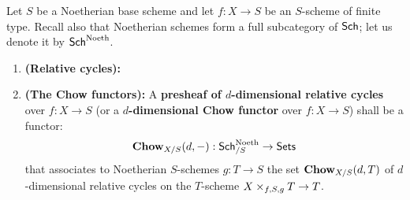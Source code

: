                 \begin{definition} \label{def: algebraic_cycles}
                    Let $S$ be a Noetherian base scheme and let $f: X \to S$ be an $S$-scheme of finite type. Recall also that Noetherian schemes form a full subcategory of $\mathsf{Sch}$; let us denote it by $\mathsf{Sch}^{\mathrm{Noeth}}$. 
                        \begin{enumerate}
                            \item \textbf{(Relative cycles):} 
                            \item \textbf{(The Chow functors):} A \textbf{presheaf of $d$-dimensional relative cycles} over $f: X \to S$ (or a \textbf{$d$-dimensional Chow functor} over $f: X \to S$) shall be a functor:
                                $$\mathbf{Chow}_{X/S}(d, -): \mathsf{Sch}_{/S}^{\mathrm{Noeth}} \to \mathsf{Sets}$$
                            that associates to Noetherian $S$-schemes $g: T \to S$ the set $\mathbf{Chow}_{X/S}(d, T)$ of $d$-dimensional relative cycles on the $T$-scheme $X \x_{f, S, g} T \to T$.
                        \end{enumerate}
                \end{definition}
                
